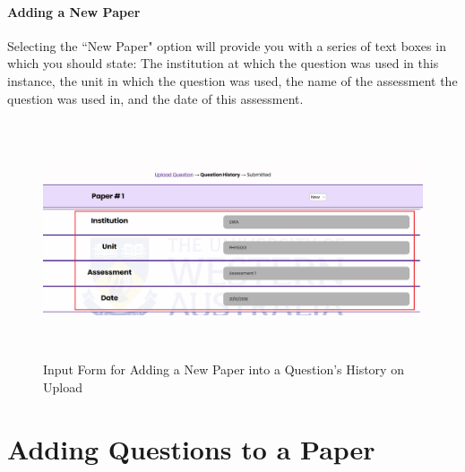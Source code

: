 \documentclass[12pt, a4paper, titlepage]{book}
\begin{document}
\subsubsection{Adding a New Paper}
Selecting the ``New Paper" option will provide you with a series of text boxes in which you should state: The institution at which the question was used in this instance, the unit in which the question was used, the name of the assessment the question was used in, and the date of this assessment.
\begin{figure}[htp]
\centering
\includegraphics[width = 14cm, height = 7cm]{uphisv1.PNG}
\caption{Input Form for Adding a New Paper into a Question's History on Upload}
\end{figure}

\chapter{Adding Questions to a Paper} \label{ch:qadd}
\end{document}
